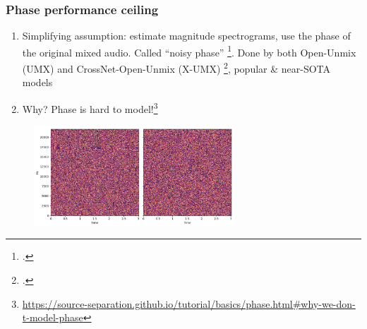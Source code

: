 \documentclass[usenames,dvipsnames]{beamer}
\begin{document}
\begin{frame}
	\frametitle{Phase performance ceiling}
	\begin{enumerate}
		\item
			Simplifying assumption: estimate magnitude spectrograms, use the phase of the original mixed audio. Called ``noisy phase'' \footcite{noisyphase1}. Done by both Open-Unmix (UMX) and CrossNet-Open-Unmix (X-UMX) \footcite{umx, xumx}, popular \& near-SOTA models
		\item
			Why? Phase is hard to model!\footnote{\url{https://source-separation.github.io/tutorial/basics/phase.html\#why-we-don-t-model-phase}}
	\end{enumerate}
	\begin{figure}[ht]
		\centering
		\includegraphics[width=7.5cm]{./images-mss/whynophase.png}
	\end{figure}
\end{frame}
\end{document}
